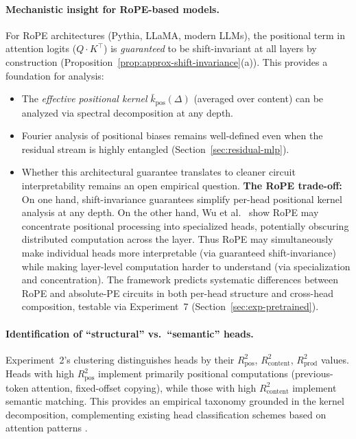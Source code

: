 \documentclass[11pt]{article}
\theoremstyle{definition}
\begin{document}
\paragraph{Mechanistic insight for RoPE-based models.}
For RoPE architectures (Pythia, LLaMA, modern LLMs), the positional term in attention logits ($Q \cdot K^{\top}$) is \emph{guaranteed} to be shift-invariant at all layers by construction (Proposition~\ref{prop:approx-shift-invariance}(a)). This provides a foundation for analysis:
\begin{itemize}
    \item The \emph{effective positional kernel} $\bar{k}_{\text{pos}}(\Delta)$ (averaged over content) can be analyzed via spectral decomposition at any depth.
    \item Fourier analysis of positional biases remains well-defined even when the residual stream is highly entangled (Section~\ref{sec:residual-mlp}).
    \item Whether this architectural guarantee translates to cleaner circuit interpretability remains an open empirical question. \textbf{The RoPE trade-off:} On one hand, shift-invariance guarantees simplify per-head positional kernel analysis at any depth. On the other hand, Wu et al.\ \cite{unpacking2025spectral} show RoPE may concentrate positional processing into specialized heads, potentially obscuring distributed computation across the layer. Thus RoPE may simultaneously make individual heads more interpretable (via guaranteed shift-invariance) while making layer-level computation harder to understand (via specialization and concentration). The framework predicts systematic differences between RoPE and absolute-PE circuits in both per-head structure and cross-head composition, testable via Experiment~7 (Section~\ref{sec:exp-pretrained}).
\end{itemize}

\paragraph{Identification of ``structural'' vs.\ ``semantic'' heads.}
Experiment~2's clustering distinguishes heads by their $R^2_{\text{pos}}$, $R^2_{\text{content}}$, $R^2_{\text{prod}}$ values. Heads with high $R^2_{\text{pos}}$ implement primarily positional computations (previous-token attention, fixed-offset copying), while those with high $R^2_{\text{content}}$ implement semantic matching. This provides an empirical taxonomy grounded in the kernel decomposition, complementing existing head classification schemes based on attention patterns \cite{clark2019analyzing,voita2019headpruning}.
\end{document}
